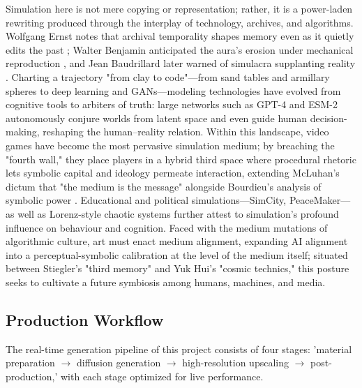 \documentclass[sigconf,nonacm]{acmart}
\begin{document}
Simulation here is not mere copying or representation; rather, it is a power-laden rewriting produced through the interplay of technology, archives, and algorithms. Wolfgang Ernst notes that archival temporality shapes memory even as it quietly edits the past \citep{Ernst_Archive}; Walter Benjamin anticipated the aura's erosion under mechanical reproduction \citep{Benjamin_WorkOfArt}, and Jean Baudrillard later warned of simulacra supplanting reality \cite{Baudrillard_Simulacra}. Charting a trajectory "from clay to code"—from sand tables and armillary spheres to deep learning and GANs—modeling technologies have evolved from cognitive tools to arbiters of truth: large networks such as GPT-4 and ESM-2 autonomously conjure worlds from latent space and even guide human decision-making, reshaping the human–reality relation. Within this landscape, video games have become the most pervasive simulation medium; by breaching the "fourth wall," they place players in a hybrid third space where procedural rhetoric lets symbolic capital and ideology permeate interaction, extending McLuhan's dictum that "the medium is the message" \cite{McLuhan_UnderstandingMedia} alongside Bourdieu's analysis of symbolic power \cite{Bourdieu_SymbolicPower}. Educational and political simulations—SimCity, PeaceMaker—as well as Lorenz-style chaotic systems further attest to simulation's profound influence on behaviour and cognition. Faced with the medium mutations of algorithmic culture, art must enact medium alignment, expanding AI alignment into a perceptual-symbolic calibration at the level of the medium itself; situated between Stiegler's "third memory" \cite{Stiegler_TechnicsTime1} and Yuk Hui's "cosmic technics," \cite{Hui_Cosmotechnics} this posture seeks to cultivate a future symbiosis among humans, machines, and media.



\subsection{Production Workflow}
The real-time generation pipeline of this project consists of four stages: 'material preparation $\rightarrow$ diffusion generation $\rightarrow$ high-resolution upscaling $\rightarrow$ post-production,' with each stage optimized for live performance.
\end{document}
